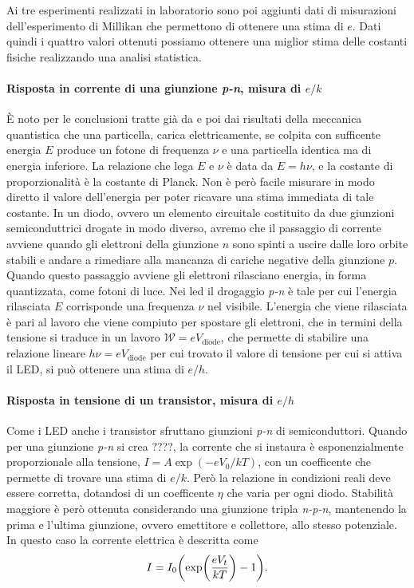 \documentclass[a4paper, varvw, nofootinbib]{revtex4-2}
\begin{document}
Ai tre esperimenti realizzati in laboratorio sono poi aggiunti dati di misurazioni dell'esperimento di Millikan che permettono di ottenere una stima di $e$. Dati quindi i quattro valori ottenuti possiamo ottenere una miglior stima delle costanti fisiche realizzando una analisi statistica.

\paragraph*{Risposta in corrente di una giunzione \emph{p-n}, misura di $e/k$}

È noto per le conclusioni tratte già da \cite{einsteinConcerningHeuristicPoint1965} e poi dai risultati della meccanica quantistica che una particella, carica elettricamente, se colpita con sufficente energia $E$ produce un fotone di frequenza $\nu$ e una particella identica ma di energia inferiore. La relazione che lega $E$ e $\nu$ è data da $E=h\nu$, e la costante di proporzionalità è la costante di Planck. Non è però facile misurare in modo diretto il valore dell'energia per poter ricavare una stima immediata di tale costante. In un diodo, ovvero un elemento circuitale costituito da due giunzioni semiconduttrici drogate in modo diverso, avremo che il passaggio di corrente avviene quando gli elettroni della giunzione $n$ sono spinti a uscire dalle loro orbite stabili e andare a rimediare alla mancanza di cariche negative della giunzione $p$. Quando questo passaggio avviene gli elettroni rilasciano energia, in forma quantizzata, come fotoni di luce. Nei led il drogaggio \emph{p-n} è tale per cui l'energia rilasciata $E$ corrisponde una frequenza $\nu$ nel visibile. L'energia che viene rilasciata è pari al lavoro che viene compiuto per spostare gli elettroni, che in termini della tensione si traduce in un lavoro $\mathcal W = e V_\text{diode}$, che permette di stabilire una relazione lineare $h\nu = eV_\text{diode}$ per cui trovato il valore di tensione per cui si attiva il LED, si può ottenere una stima di $e/h$.

\paragraph*{Risposta in tensione di un transistor, misura di $e/h$}

Come i LED anche i transistor sfruttano giunzioni \emph{p-n} di semiconduttori. Quando per una giunzione \emph{p-n} si crea ????, la corrente che si instaura è esponenzialmente proporzionale alla tensione, $I=A\exp(-eV_0/kT)$, con un coefficente che permette di trovare una stima di $e/k$. Però la relazione in condizioni reali deve essere corretta, dotandosi di un coefficente $\eta$ che varia per ogni diodo. Stabilità maggiore è però ottenuta considerando una giunzione tripla \emph{n-p-n}, mantenendo la prima e l'ultima giunzione, ovvero emettitore e collettore, allo stesso potenziale. In questo caso la corrente elettrica è descritta come \begin{equation} I = I_0 \qty(\exp(\frac{eV_{t}}{kT}) - 1). \end{equation}
\end{document}
